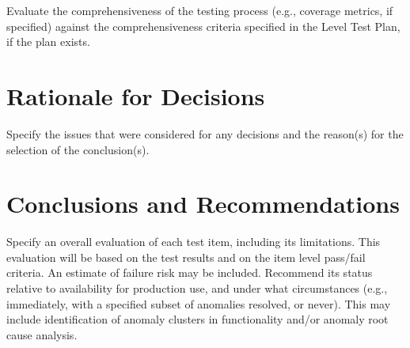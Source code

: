Evaluate the comprehensiveness of the testing process (e.g., coverage metrics, if specified) against the
comprehensiveness criteria specified in the Level Test Plan, if the plan exists.

\section{Rationale for Decisions}
Specify the issues that were considered for any decisions and the reason(s) for the selection of the
conclusion(s).

\section{Conclusions and Recommendations}
Specify an overall evaluation of each test item, including its limitations. This evaluation will be based
on the test results and on the item level pass/fail criteria. An estimate of failure risk may be included.
Recommend its status relative to availability for production use, and under what circumstances (e.g.,
immediately, with a specified subset of anomalies resolved, or never). This may include identification
of anomaly clusters in functionality and/or anomaly root cause analysis.

